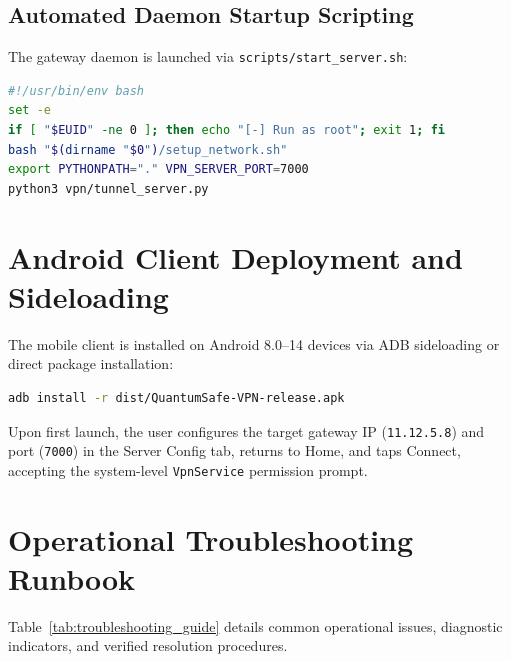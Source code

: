 \subsection{Automated Daemon Startup Scripting}
The gateway daemon is launched via \texttt{scripts/start\_server.sh}:
\begin{lstlisting}[language=bash, basicstyle=\ttfamily\scriptsize]
#!/usr/bin/env bash
set -e
if [ "$EUID" -ne 0 ]; then echo "[-] Run as root"; exit 1; fi
bash "$(dirname "$0")/setup_network.sh"
export PYTHONPATH="." VPN_SERVER_PORT=7000
python3 vpn/tunnel_server.py
\end{lstlisting}

\section{Android Client Deployment and Sideloading}
\label{sec:android_client_deployment}

The mobile client is installed on Android 8.0--14 devices via ADB sideloading or direct package installation:
\begin{lstlisting}[language=bash, basicstyle=\ttfamily\scriptsize]
adb install -r dist/QuantumSafe-VPN-release.apk
\end{lstlisting}
Upon first launch, the user configures the target gateway IP (\texttt{11.12.5.8}) and port (\texttt{7000}) in the Server Config tab, returns to Home, and taps Connect, accepting the system-level \texttt{VpnService} permission prompt.

\section{Operational Troubleshooting Runbook}
\label{sec:troubleshooting_runbook}

Table~\ref{tab:troubleshooting_guide} details common operational issues, diagnostic indicators, and verified resolution procedures.

